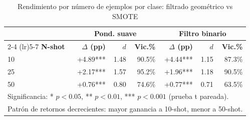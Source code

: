\begin{table}[htbp]
\centering
\caption{Rendimiento por número de ejemplos por clase: filtrado geométrico vs SMOTE}
\label{tab:modern_nshot}
\begin{tabular}{lrrrrrr}
\toprule
 & \multicolumn{3}{c}{\textbf{Pond. suave}} & \multicolumn{3}{c}{\textbf{Filtro binario}} \\
\cmidrule(lr){2-4} \cmidrule(lr){5-7}
\textbf{N-shot} & \textbf{$\Delta$ (pp)} & \textbf{$d$} & \textbf{Vic.\%} & \textbf{$\Delta$ (pp)} & \textbf{$d$} & \textbf{Vic.\%} \\
\midrule
10 & +4.89*** & 1.48 & 90.5\% & +4.44*** & 1.15 & 87.3\% \\
25 & +2.17*** & 1.57 & 95.2\% & +1.96*** & 1.18 & 90.5\% \\
50 & +0.76*** & 0.80 & 74.6\% & +0.77*** & 0.71 & 63.5\% \\
\midrule
\multicolumn{7}{l}{\small Significancia: * $p<0.05$, ** $p<0.01$, *** $p<0.001$ (prueba t pareada).} \\
\multicolumn{7}{l}{\small Patrón de retornos decrecientes: mayor ganancia a 10-shot, menor a 50-shot.} \\
\bottomrule
\end{tabular}
\end{table}